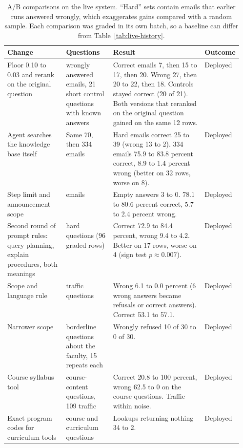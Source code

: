 \begin{table}[htbp]
\centering
\caption[A/B comparisons on the live system]{A/B comparisons on the live system. ``Hard'' sets contain emails that earlier runs answered wrongly, which exaggerates gains compared with a random sample. Each comparison was graded in its own batch, so a baseline can differ from Table~\ref{tab:live-history}.}
\label{tab:live-ab}
\footnotesize
\begin{tabularx}{\linewidth}{@{}>{\raggedright\arraybackslash}p{0.25\linewidth}>{\raggedright\arraybackslash}p{0.2\linewidth}>{\raggedright\arraybackslash}X>{\raggedright\arraybackslash}p{0.11\linewidth}@{}}
\toprule
Change & Questions & Result & Outcome \\
\midrule
Floor 0.10 to 0.03 and rerank on the original question & 49 wrongly answered emails, 21 short control questions with known answers & Correct emails 7, then 15 to 17, then 20. Wrong 27, then 20 to 22, then 18. Controls stayed correct (20 of 21). Both versions that reranked on the original question gained on the same 12 rows. & Deployed \\
Agent searches the knowledge base itself & Same 70, then 334 emails & Hard emails correct 25 to 39 (wrong 13 to 2). 334 emails 75.9 to 83.8 percent correct, 8.9 to 1.4 percent wrong (better on 32 rows, worse on 8). & Deployed \\
Step limit and announcement scope & 334 emails & Empty answers 3 to 0. 78.1 to 80.6 percent correct, 5.7 to 2.4 percent wrong. & Deployed \\
Second round of prompt rules: query planning, explain procedures, both meanings & 97 hard questions (96 graded rows) & Correct 72.9 to 84.4 percent, wrong 9.4 to 4.2. Better on 17 rows, worse on 4 (sign test $p\approx0.007$). & Deployed \\
Scope and language rule & 109 traffic questions & Wrong 6.1 to 0.0 percent (6 wrong answers became refusals or correct answers). Correct 53.1 to 57.1. & Deployed \\
Narrower scope & 2 borderline questions about the faculty, 15 repeats each & Wrongly refused 10 of 30 to 0 of 30. & Deployed \\
Course syllabus tool & 24 course-content questions, 109 traffic & Correct 20.8 to 100 percent, wrong 62.5 to 0 on the course questions. Traffic within noise. & Deployed \\
Exact program codes for curriculum tools & 63 course and curriculum questions & Lookups returning nothing 34 to 2. & Deployed \\

\end{tabularx}
\end{table}
